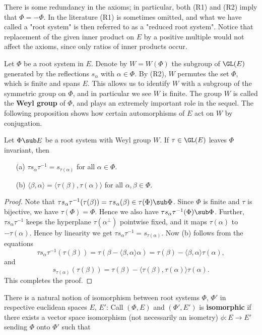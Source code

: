 There is some redundancy in the axioms; in particular, both (R1) and (R2) imply that $\Phi=-\Phi$. In the literature (R1) is sometimes omitted, and what we have called a "root system" is then referred to as a "reduced root system". Notice that replacement of the given inner product on $E$ by a positive multiple would not affect the axioms, since only ratios of inner products occur.\par
Let $\Phi$ be a root system in $E$. Denote by $W=W(\Phi)$ the subgroup of $\GL(E)$ generated by the reflections $s_\alpha$ with $\alpha\in\Phi$. By (R2), $W$ permutes the set $\Phi$, which is finite and spans $E$. This allows us to identify $W$ with a subgroup of the symmetric group on $\Phi$, and in particular we see $W$ is finite. The group $W$ is called the \textbf{Weyl group} of $\Phi$, and plays an extremely important role in the sequel. The following proposition shows how certain automorphisms of $E$ act on $W$ by conjugation.
\begin{proposition}\label{root system invariant transform prop}
Let $\Phi\sub E$ be a root system with Weyl group $W$. If $\tau\in\GL(E)$ leaves $\Phi$ invariant, then
\begin{itemize}
\item[(a)] $\tau s_\alpha\tau^{-1}=s_{\tau(\alpha)}$ for all $\alpha\in\Phi$.
\item[(b)] $\langle\beta,\alpha\rangle=\langle\tau(\beta),\tau(\alpha)\rangle$ for all $\alpha,\beta\in\Phi$.
\end{itemize}
\end{proposition}
\begin{proof}
Note that $\tau s_\alpha\tau^{-1}(\tau(\beta))=\tau s_\alpha(\beta)\in\tau(\Phi)\sub\Phi$. Since $\Phi$ is finite and $\tau$ is bijective, we have $\tau(\Phi)=\Phi$. Hence we also have $\tau s_\alpha\tau^{-1}(\Phi)\sub\Phi$. Further, $\tau s_\alpha\tau^{-1}$ keeps the hyperplane $\tau(\alpha^\bot)$ pointwise fixed, and it maps $\tau(\alpha)$ to $-\tau(\alpha)$. Hence by linearity we get $\tau s_\alpha\tau^{-1}=s_{\tau(\alpha)}$. Now (b) follows from the equations
\[\tau s_\alpha\tau^{-1}(\tau(\beta))=\tau(\beta-\langle\beta,\alpha\rangle\alpha)=\tau(\beta)-\langle\beta,\alpha\rangle\tau(\alpha),\]
and
\[s_{\tau(\alpha)}(\tau(\beta))=\tau(\beta)-\langle\tau(\beta),\tau(\alpha)\rangle\tau(\alpha).\]
This completes the proof.
\end{proof}
There is a natural notion of isomorphism between root systems $\Phi$, $\Phi'$ in respective euclidean spaces $E$, $E'$: Call $(\Phi,E)$ and $(\Phi',E')$ is \textbf{isomorphic} if there exists a vector space isomorphism (not necessarily an isometry) $\phi:E\to E'$ sending $\Phi$ onto $\Phi'$ such that
